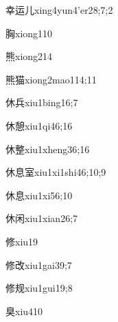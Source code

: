 \begin{verbete}{幸运儿}{xing4yun4'er2}{8;7;2}
\end{verbete}
\begin{verbete}{胸}{xiong1}{10}
\end{verbete}
\begin{verbete}{熊}{xiong2}{14}
\end{verbete}
\begin{verbete}{熊猫}{xiong2mao1}{14;11}
\end{verbete}
\begin{verbete}{休兵}{xiu1bing1}{6;7}
\end{verbete}
\begin{verbete}{休憩}{xiu1qi4}{6;16}
\end{verbete}
\begin{verbete}{休整}{xiu1xheng3}{6;16}
\end{verbete}
\begin{verbete}{休息室}{xiu1xi1shi4}{6;10;9}
\end{verbete}
\begin{verbete}{休息}{xiu1xi5}{6;10}
\end{verbete}
\begin{verbete}{休闲}{xiu1xian2}{6;7}
\end{verbete}
\begin{verbete}{修}{xiu1}{9}
\end{verbete}
\begin{verbete}{修改}{xiu1gai3}{9;7}
\end{verbete}
\begin{verbete}{修规}{xiu1gui1}{9;8}
\end{verbete}
\begin{verbete}{臭}{xiu4}{10}
\end{verbete}
